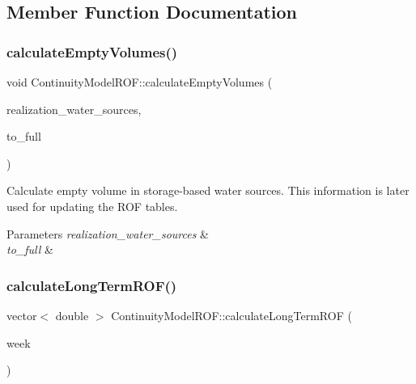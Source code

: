 \subsection{Member Function Documentation}
\mbox{\label{classContinuityModelROF_aa720006d12410fc35b8768eda716c149}} 
\subsubsection{\texorpdfstring{calculate\+Empty\+Volumes()}{calculateEmptyVolumes()}}
{\footnotesize\ttfamily void Continuity\+Model\+R\+O\+F\+::calculate\+Empty\+Volumes (\begin{DoxyParamCaption}\item[{vector$<$ \mbox{\hyperlink{classWaterSource}{Water\+Source}} $\ast$$>$ \&}]{realization\+\_\+water\+\_\+sources,  }\item[{double $\ast$}]{to\+\_\+full }\end{DoxyParamCaption})}

Calculate empty volume in storage-\/based water sources. This information is later used for updating the R\+OF tables. 
\begin{DoxyParams}{Parameters}
{\em realization\+\_\+water\+\_\+sources} & \\
\hline
{\em to\+\_\+full} & \\
\hline
\end{DoxyParams}
\mbox{\label{classContinuityModelROF_ab6e6125e6ea195d7c29a0c6d2203d51c}} 
\subsubsection{\texorpdfstring{calculate\+Long\+Term\+R\+O\+F()}{calculateLongTermROF()}}
{\footnotesize\ttfamily vector$<$ double $>$ Continuity\+Model\+R\+O\+F\+::calculate\+Long\+Term\+R\+OF (\begin{DoxyParamCaption}\item[{int}]{week }\end{DoxyParamCaption})}

